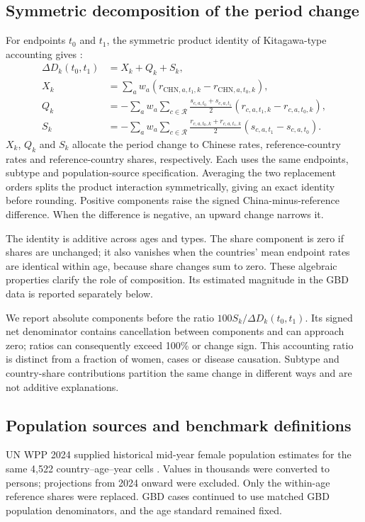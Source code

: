 \documentclass[11pt,a4paper]{article}
\begin{document}
\subsection{Symmetric decomposition of the period change}
For endpoints $t_0$ and $t_1$, the symmetric product identity of Kitagawa-type accounting gives \citep{kitagawa}:
\begin{align}
 \Delta D_k(t_0,t_1)&=X_k+Q_k+S_k,\\
 X_k&=\sum_a w_a(r_{\mathrm{CHN},a,t_1,k}-r_{\mathrm{CHN},a,t_0,k}),\\
 Q_k&=-\sum_a w_a\sum_{c\in\mathcal{R}}\frac{s_{c,a,t_0}+s_{c,a,t_1}}{2}(r_{c,a,t_1,k}-r_{c,a,t_0,k}),\\
 S_k&=-\sum_a w_a\sum_{c\in\mathcal{R}}\frac{r_{c,a,t_0,k}+r_{c,a,t_1,k}}{2}(s_{c,a,t_1}-s_{c,a,t_0}).
\end{align}
$X_k$, $Q_k$ and $S_k$ allocate the period change to Chinese rates, reference-country rates and reference-country shares, respectively. Each uses the same endpoints, subtype and population-source specification. Averaging the two replacement orders splits the product interaction symmetrically, giving an exact identity before rounding. Positive components raise the signed China-minus-reference difference. When the difference is negative, an upward change narrows it.

The identity is additive across ages and types. The share component is zero if shares are unchanged; it also vanishes when the countries' mean endpoint rates are identical within age, because share changes sum to zero. These algebraic properties clarify the role of composition. Its estimated magnitude in the GBD data is reported separately below.

We report absolute components before the ratio $100S_k/\Delta D_k(t_0,t_1)$. Its signed net denominator contains cancellation between components and can approach zero; ratios can consequently exceed 100\% or change sign. This accounting ratio is distinct from a fraction of women, cases or disease causation. Subtype and country-share contributions partition the same change in different ways and are not additive explanations.

\subsection{Population sources and benchmark definitions}
UN WPP 2024 supplied historical mid-year female population estimates for the same 4,522 country--age--year cells \citep{wpp2024}. Values in thousands were converted to persons; projections from 2024 onward were excluded. Only the within-age reference shares were replaced. GBD cases continued to use matched GBD population denominators, and the age standard remained fixed.
\end{document}
